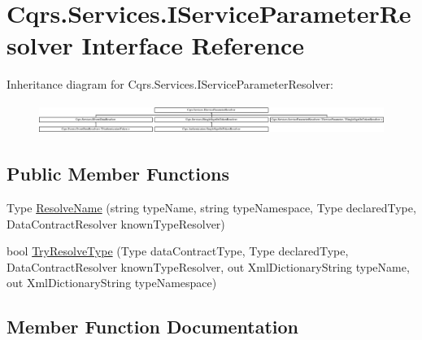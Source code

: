 \hypertarget{interfaceCqrs_1_1Services_1_1IServiceParameterResolver}{}\section{Cqrs.\+Services.\+I\+Service\+Parameter\+Resolver Interface Reference}
\label{interfaceCqrs_1_1Services_1_1IServiceParameterResolver}
Inheritance diagram for Cqrs.\+Services.\+I\+Service\+Parameter\+Resolver\+:\begin{figure}[H]
\begin{center}
\leavevmode
\includegraphics[height=0.989399cm]{interfaceCqrs_1_1Services_1_1IServiceParameterResolver}
\end{center}
\end{figure}
\subsection*{Public Member Functions}
\begin{DoxyCompactItemize}
\item 
Type \hyperlink{interfaceCqrs_1_1Services_1_1IServiceParameterResolver_a37c4b53616192e4e2f15ab4661ab99ae_a37c4b53616192e4e2f15ab4661ab99ae}{Resolve\+Name} (string type\+Name, string type\+Namespace, Type declared\+Type, Data\+Contract\+Resolver known\+Type\+Resolver)
\item 
bool \hyperlink{interfaceCqrs_1_1Services_1_1IServiceParameterResolver_a31c82a00b192b877faff6df99e1b689b_a31c82a00b192b877faff6df99e1b689b}{Try\+Resolve\+Type} (Type data\+Contract\+Type, Type declared\+Type, Data\+Contract\+Resolver known\+Type\+Resolver, out Xml\+Dictionary\+String type\+Name, out Xml\+Dictionary\+String type\+Namespace)
\end{DoxyCompactItemize}


\subsection{Member Function Documentation}
\mbox{\label{interfaceCqrs_1_1Services_1_1IServiceParameterResolver_a37c4b53616192e4e2f15ab4661ab99ae_a37c4b53616192e4e2f15ab4661ab99ae}} 
